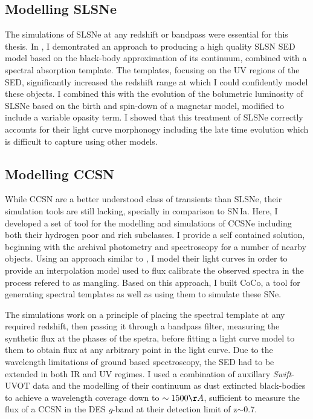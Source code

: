 \subsection{Modelling SLSNe}
The simulations of SLSNe at any redshift or bandpass were essential for this thesis. In , I demontrated an approach to producing a high quality SLSN SED model based on the black-body approximation of its continuum, combined with a spectral absorption template. The templates, focusing on the UV regions of the SED, significantly increased the redshift range at which I could confidently model these objects. I combined this with the evolution of the bolumetric luminosity of SLSNe based on the birth and spin-down of a magnetar model, modified to include a variable opasity term. I showed that this treatment of SLSNe correctly accounts for their light curve morphonogy including the late time evolution which is difficult to capture using other models.

\subsection{Modelling CCSN}
While CCSN are a better understood class of transients than SLSNe, their simulation tools are still lacking, specially in comparison to SN\,Ia. Here, I developed a set of tool for the modelling and simulations of CCSNe including both their hydrogen poor and rich subclasses. I provide a self contained solution, beginning with the archival photometry and spectroscopy for a number of nearby objects. Using an approach similar to \citet{Bazin2009}, I model their light curves in order to provide an interpolation model used to flux calibrate the observed spectra in the process refered to as mangling. Based on this approach, I built CoCo, a tool for generating spectral templates as well as using them to simulate these SNe.

The simulations work on a principle of placing the spectral template at any required redshift, then passing it through a bandpass filter, measuring the synthetic flux at the phases of the spetra, before fitting a light curve model to them to obtain flux at any arbitrary point in the light curve. Due to the wavelength limitations of ground based spectroscopy, the SED had to be extended in both IR and UV regimes. I used a combination of auxillary \textit{Swift}-UVOT data and the modelling of their continuum as dust extincted black-bodies to achieve a wavelength coverage down to $\sim1500\AA$, sufficient to measure the flux of a CCSN in the DES \textit{g}-band at their detection limit of z$\sim$0.7.

